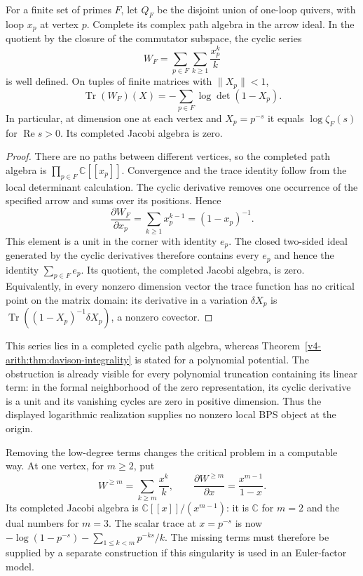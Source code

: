 \begin{proposition}
\label{v4-arith:ks:logarithmic-potential-obstruction}
\ClaimStatusProvedHere{}
For a finite set of primes $F$, let $Q_F$ be the disjoint union of
one-loop quivers, with loop $x_p$ at vertex $p$. Complete its complex
path algebra in the arrow ideal. In the quotient by the closure of
the commutator subspace, the cyclic series
\[
 W_F=\sum_{p\in F}\sum_{k\geq1}\frac{x_p^k}{k}
\]
is well defined. On tuples of finite matrices with $\|X_p\|<1$,
\[
 \operatorname{Tr}(W_F)(X)
   =-\sum_{p\in F}\log\det(1-X_p).
\]
In particular, at dimension one at each vertex and
$X_p=p^{-s}$ it equals $\log\zeta_F(s)$ for
$\operatorname{Re}s>0$. Its completed Jacobi algebra is zero.
\end{proposition}

\begin{proof}
There are no paths between different vertices, so the completed
path algebra is $\prod_{p\in F}\mathbb C[[x_p]]$.
Convergence and the trace identity follow from the local determinant
calculation. The cyclic derivative removes one occurrence of the
specified arrow and sums over its positions. Hence
\[
 \frac{\partial W_F}{\partial x_p}
   =\sum_{k\geq1}x_p^{k-1}=(1-x_p)^{-1}.
\]
This element is a unit in the corner with identity $e_p$.
The closed two-sided ideal generated by the cyclic derivatives
therefore contains every $e_p$ and hence the identity $\sum_{p\in F}e_p$.
Its quotient, the completed Jacobi algebra, is zero.
Equivalently, in every nonzero dimension vector the trace function
has no critical point on the matrix domain: its derivative in a variation $\delta X_p$ is
$\operatorname{Tr}((1-X_p)^{-1}\delta X_p)$, a nonzero covector.
\end{proof}

This series lies in a completed cyclic path algebra, whereas
Theorem~\ref{v4-arith:thm:davison-integrality} is stated for a
polynomial potential. The obstruction is already visible for every
polynomial truncation containing its linear term: in the formal
neighborhood of the zero representation, its cyclic derivative is
a unit and its vanishing cycles are zero in positive dimension.
Thus the displayed logarithmic realization supplies no nonzero
local BPS object at the origin.

Removing the low-degree terms changes the critical problem in a
computable way. At one vertex, for $m\geq2$, put
\[
 W^{\geq m}=\sum_{k\geq m}\frac{x^k}{k},\qquad
 \frac{\partial W^{\geq m}}{\partial x}
   =\frac{x^{m-1}}{1-x}.
\]
Its completed Jacobi algebra is
$\mathbb C[[x]]/(x^{m-1})$: it is $\mathbb C$ for $m=2$ and
the dual numbers for $m=3$. The scalar trace at $x=p^{-s}$ is now
$-\log(1-p^{-s})-\sum_{1\leq k<m}p^{-ks}/k$.
The missing terms must therefore be supplied by a separate
construction if this singularity is used in an Euler-factor model.

